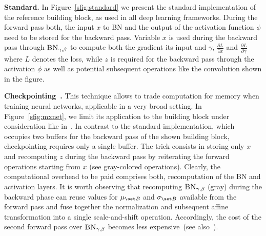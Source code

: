 \documentclass[10pt,twocolumn,letterpaper]{article}
\newcommand{\myparagraph}[1]{\vspace{5pt}\noindent\textbf{#1}}
\begin{document}
\myparagraph{Standard.}
In Figure~\ref{sfig:standard} we present the standard implementation of the reference building block, as used in all deep learning frameworks. During the forward pass both, the input $x$ to \textsc{BN} and the output of the activation function $\phi$ need to be stored for the backward pass. Variable $x$ is used during the backward pass through $\textsc{BN}_{\gamma,\beta}$ to compute both the gradient \wrt its input and $\gamma$, \ie $\frac{\partial L}{\partial x}$ and $\frac{\partial L}{\partial\gamma}$ where $L$ denotes the loss, while $z$ is required for the backward pass through the activation $\phi$ as well as potential subsequent operations like \eg the convolution shown in the figure.


\myparagraph{Checkpointing~\cite{Martens2012,Chen+16}.}
This technique allows to trade computation for memory when training neural networks, applicable in a very broad setting. In Figure~\ref{sfig:mxnet}, we limit its application to the building block under consideration like in~\cite{Pleiss+17}.
In contrast to the standard implementation, which occupies two buffers for the backward pass of the shown building block,
checkpointing requires only a single buffer. %
The trick consists in storing only $x$ and recomputing $z$ during the backward pass by reiterating the forward operations starting from $x$ (see gray-colored operations). Clearly, the computational overhead to be paid comprises both, recomputation of the \textsc{BN} and activation layers. 
It is worth observing that recomputing $\textsc{BN}_{\gamma,\beta}$ (gray) during the backward phase can reuse values for $\mu_{\set B}$ and $\sigma_{\set B}$ available from the forward pass and fuse together the normalization and subsequent affine transformation into a single scale-and-shift operation. Accordingly, the cost of the second forward pass over $\textsc{BN}_{\gamma,\beta}$ becomes less expensive~(see also~\cite{Pleiss+17}).
\end{document}
